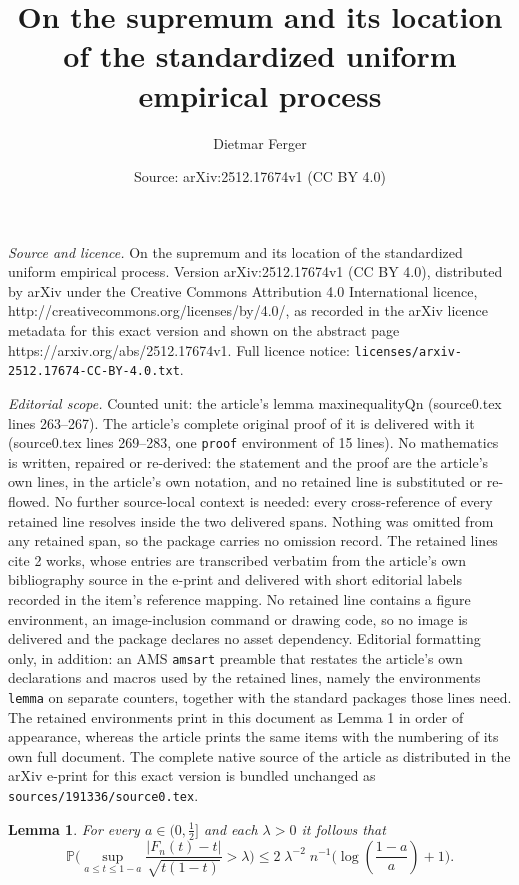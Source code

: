 \documentclass[10pt,a4paper]{amsart}
\title{On the supremum and its location of the standardized uniform empirical process}
\author{Dietmar Ferger}
\date{Source: arXiv:2512.17674v1 (CC BY 4.0)}
\newtheorem{lemma}{Lemma}
\begin{document}
\maketitle

\noindent\emph{Source and licence.} On the supremum and its location of the standardized uniform empirical process. Version arXiv:2512.17674v1 (CC BY 4.0), distributed by arXiv under the Creative Commons Attribution 4.0 International licence, http://creativecommons.org/licenses/by/4.0/, as recorded in the arXiv licence metadata for this exact version and shown on the abstract page https://arxiv.org/abs/2512.17674v1. Full licence notice: \texttt{licenses/arxiv-2512.17674-CC-BY-4.0.txt}.\par\smallskip

\noindent\textit{Editorial scope.} Counted unit: the article's lemma maxinequalityQn (source0.tex lines 263--267). The article's complete original proof of it is delivered with it (source0.tex lines 269--283, one \texttt{proof} environment of 15 lines). No mathematics is written, repaired or re-derived: the statement and the proof are the article's own lines, in the article's own notation, and no retained line is substituted or re-flowed.  No further source-local context is needed: every cross-reference of every retained line resolves inside the two delivered spans.  Nothing was omitted from any retained span, so the package carries no omission record.  The retained lines cite 2 works, whose entries are transcribed verbatim from the article's own bibliography source in the e-print and delivered with short editorial labels recorded in the item's reference mapping.  No retained line contains a figure environment, an image-inclusion command or drawing code, so no image is delivered and the package declares no asset dependency.  Editorial formatting only, in addition: an AMS \texttt{amsart} preamble that restates the article's own declarations and macros used by the retained lines, namely the environments \texttt{lemma} on separate counters, together with the standard packages those lines need.  The retained environments print in this document as Lemma 1 in order of appearance, whereas the article prints the same items with the numbering of its own full document.  The complete native source of the article as distributed in the arXiv e-print for this exact version is bundled unchanged as \texttt{sources/191336/source0.tex}.
\begin{lemma} \label{maxinequalityQn} For every $a \in (0,\frac{1}{2}]$ and each $\lambda>0$ it follows that
\begin{equation} \label{maxinequality}
\mathbb{P}\big(\sup_{a \le t \le 1-a} \frac{|F_n(t)-t|}{\sqrt{t(1-t)}} > \lambda \big) \le 2 \; \lambda^{-2} \; n^{-1} \big(\log(\frac{1-a}{a})+1\big).
\end{equation}
\end{lemma}
\end{document}
